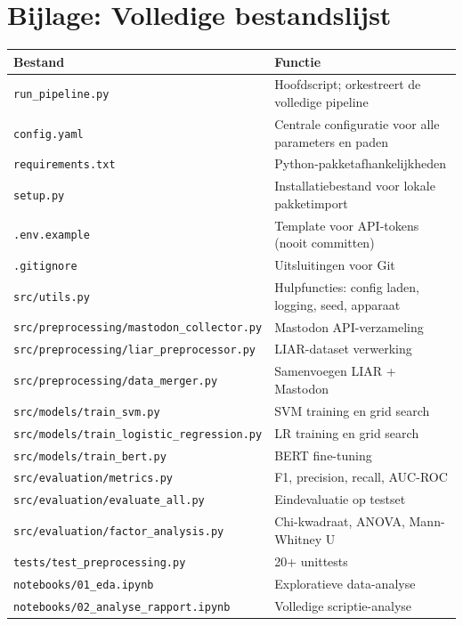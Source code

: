 \documentclass[dutch,dit,thesis]{hogentreport}
\begin{document}
\chapter{Bijlage: Volledige bestandslijst}
\label{ch:bijlage-bestandslijst}
\begin{longtable}{lp{8cm}}
\toprule
\textbf{Bestand} & \textbf{Functie} \\
\midrule
\endhead
\texttt{run\_pipeline.py} & Hoofdscript; orkestreert de volledige pipeline \\
\texttt{config.yaml} & Centrale configuratie voor alle parameters en paden \\
\texttt{requirements.txt} & Python-pakketafhankelijkheden \\
\texttt{setup.py} & Installatiebestand voor lokale pakketimport \\
\texttt{.env.example} & Template voor API-tokens (nooit committen) \\
\texttt{.gitignore} & Uitsluitingen voor Git \\
\texttt{src/utils.py} & Hulpfuncties: config laden, logging, seed, apparaat \\
\texttt{src/preprocessing/mastodon\_collector.py} & Mastodon API-verzameling \\
\texttt{src/preprocessing/liar\_preprocessor.py} & LIAR-dataset verwerking \\
\texttt{src/preprocessing/data\_merger.py} & Samenvoegen LIAR + Mastodon \\
\texttt{src/models/train\_svm.py} & SVM training en grid search \\
\texttt{src/models/train\_logistic\_regression.py} & LR training en grid search \\
\texttt{src/models/train\_bert.py} & BERT fine-tuning \\
\texttt{src/evaluation/metrics.py} & F1, precision, recall, AUC-ROC \\
\texttt{src/evaluation/evaluate\_all.py} & Eindevaluatie op testset \\
\texttt{src/evaluation/factor\_analysis.py} & Chi-kwadraat, ANOVA, Mann-Whitney U \\
\texttt{tests/test\_preprocessing.py} & 20+ unittests \\
\texttt{notebooks/01\_eda.ipynb} & Exploratieve data-analyse \\
\texttt{notebooks/02\_analyse\_rapport.ipynb} & Volledige scriptie-analyse \\
\bottomrule
\end{longtable}
\end{document}
